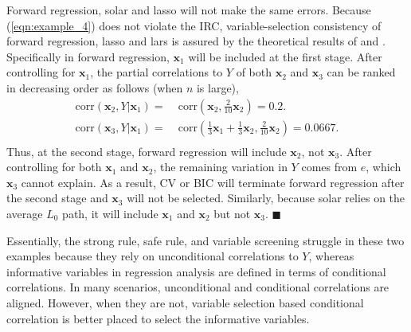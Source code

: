\documentclass[11pt,review,authoryear]{elsarticle}
\begin{document}
Forward regression, solar and lasso will not make the same errors. Because (\ref{eqn:example_4}) does not violate the IRC, variable-selection consistency of forward regression, lasso and lars is assured by the theoretical results of \citet{zhang09} and \citet{zhaoyu06}. Specifically in forward regression, $\mathbf{x}_1$ will be included  at the first stage. After controlling for $\mathbf{x}_1$, the partial correlations to $Y$ of both $\mathbf{x}_2$ and $\mathbf{x}_3$ can be ranked in decreasing order as follows (when $n$ is large),
%
\begin{equation}
  \begin{aligned}
    \mathrm{corr} \left( \mathbf{x}_2, Y \vert \mathbf{x}_1 \right)  = & \;\mathrm{corr} \left( \mathbf{x}_2, \frac{2}{10} \mathbf{x}_2 \right)
    = 0.2. \\
    \mathrm{corr} \left( \mathbf{x}_3, Y \vert \mathbf{x}_1 \right)  = & \;\mathrm{corr} \left( \frac{1}{3} \mathbf{x}_1 + \frac{1}{3} \mathbf{x}_2, \frac{2}{10} \mathbf{x}_2 \right)
    = 0.0667. \\
  \end{aligned}
\end{equation}
%
Thus, at the second stage, forward regression will include $\mathbf{x}_2$, not $\mathbf{x}_3$. After controlling for both $\mathbf{x}_1$ and $\mathbf{x}_2$, the remaining variation in $Y$ comes from $e$, which $\mathbf{x}_3$ cannot explain. As a result, CV or BIC will terminate forward regression after the second stage and $\mathbf{x}_3$ will not be selected. Similarly, because solar relies on the average $L_0$ path, it will include $\mathbf{x}_1$ and $\mathbf{x}_2$ but not $\mathbf{x}_3$. $\blacksquare$

\smallskip
Essentially, the strong rule, safe rule, and variable screening struggle in these two examples because they rely on unconditional correlations to $Y$, whereas informative variables in regression analysis are defined in terms of conditional correlations. In many scenarios, unconditional and conditional correlations are aligned. However, when they are not, variable selection based conditional correlation is better placed to select the informative variables.
\end{document}
